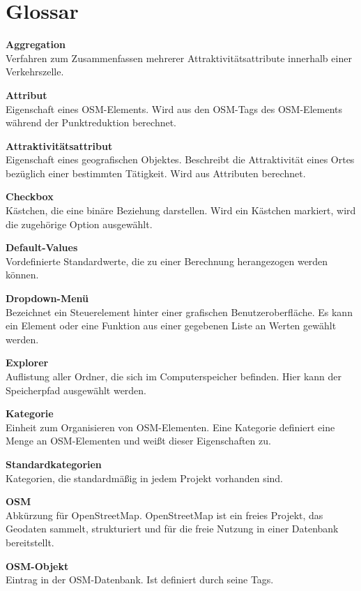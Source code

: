 \documentclass[parskip=full]{scrartcl} %
\begin{document}
\newpage

\section{Glossar}

\textbf{Aggregation}\\
Verfahren zum Zusammenfassen mehrerer Attraktivitätsattribute innerhalb einer Verkehrszelle.

\textbf{Attribut}\\
Eigenschaft eines OSM-Elements. Wird aus den OSM-Tags des OSM-Elements während der Punktreduktion berechnet.


\textbf{Attraktivitätsattribut}\\
Eigenschaft eines geografischen Objektes. Beschreibt die Attraktivität eines Ortes bezüglich einer bestimmten Tätigkeit. Wird aus Attributen berechnet.

\textbf{Checkbox}\\
Kästchen, die eine binäre Beziehung darstellen. Wird ein Kästchen markiert, wird die zugehörige Option ausgewählt.

\textbf{Default-Values}\\
Vordefinierte Standardwerte, die zu einer Berechnung herangezogen werden können.

\textbf{Dropdown-Menü}\\
Bezeichnet ein Steuerelement hinter einer grafischen Benutzeroberfläche. Es kann ein Element oder eine Funktion aus einer gegebenen Liste an Werten gewählt werden.

\textbf{Explorer}\\
Auflistung aller Ordner, die sich im Computerspeicher befinden. Hier kann der Speicherpfad ausgewählt werden.

\textbf{Kategorie}\\
Einheit zum Organisieren von OSM-Elementen. Eine Kategorie definiert eine Menge an OSM-Elementen und weißt dieser Eigenschaften zu.

\textbf{Standardkategorien}\\
Kategorien, die standardmäßig in jedem Projekt vorhanden sind.

\textbf{OSM}\\
Abkürzung für OpenStreetMap. OpenStreetMap ist ein freies Projekt, das Geodaten sammelt, strukturiert und für die freie Nutzung in einer Datenbank bereitstellt.

\textbf{OSM-Objekt}\\
Eintrag in der OSM-Datenbank. Ist definiert durch seine Tags.
\end{document}
